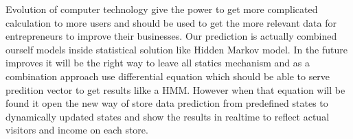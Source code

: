 Evolution of computer technology give the power to get more complicated calculation to more users and should be used to get the more relevant data for entrepreneurs to improve their businesses.
Our prediction is actually combined ourself models inside statistical solution like Hidden Markov model.
In the future improves it will be the right way to leave all statics mechanism and as a combination approach use differential equation which should be able to serve predition vector to get results lilke a HMM.
However when that equation will be found it open the new way of store data prediction from predefined states to dynamically updated states and show the results in realtime to reflect actual visitors and income on each store.
